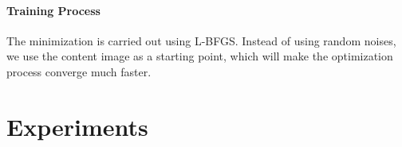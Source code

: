 \documentclass[10pt,twocolumn,letterpaper]{article}
\begin{document}
\paragraph*{Training Process} The minimization is carried out using L-BFGS. Instead of using random noises, we use the content image as a starting point, which will make the optimization process converge much faster. 


\section{Experiments}

\end{document}
